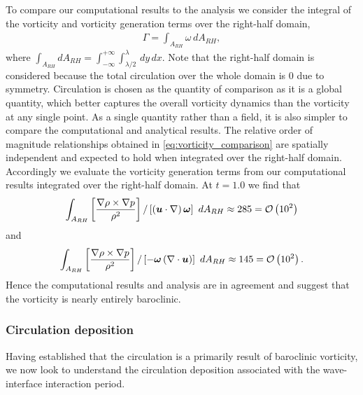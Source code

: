 To compare our computational results to the analysis we consider the
integral of the vorticity and vorticity generation terms over the
right-half domain,
\begin{align}
  \Gamma = \int_{A_{RH}} \omega \,dA_{RH},
\end{align}
where
$\int_{A_{RH}} dA_{RH} =
\int_{-\infty}^{+\infty}\int_{\lambda/2}^{\lambda} \,dy\, dx$. Note
that the right-half domain is considered because the total circulation
over the whole domain is $0$ due to symmetry. Circulation is chosen as
the quantity of comparison as it is a global quantity, which better
captures the overall vorticity dynamics than the vorticity at any
single point. As a single quantity rather than a field, it is also
simpler to compare the computational and analytical results. The
relative order of magnitude relationships obtained in
\eqref{eq:vorticity_comparison} are spatially independent and expected
to hold when integrated over the right-half domain. Accordingly we
evaluate the vorticity generation terms from our computational results
integrated over the right-half domain. At $t=1.0$ we find that %
$$ \int_{A_{RH}} \left[\frac{\nabla\rho\times\nabla p}{\rho^2}\right] / \left[\left(\boldsymbol{u}\cdot\nabla\right)\boldsymbol{\omega}\right]\,\,dA_{RH}\approx 285=\mathcal{O}\left(10^2\right)$$
and
$$ \int_{A_{RH}} \left[\frac{\nabla\rho\times\nabla p}{\rho^2}\right] / \left[-\boldsymbol{\omega}\left(\nabla\cdot\boldsymbol{u}\right)\right]\,\,dA_{RH} \approx 145=\mathcal{O}\left(10^2\right).$$%
%
Hence the computational results and analysis are in agreement and suggest
that the vorticity is nearly entirely baroclinic.
% 
% 
\subsubsection{Circulation deposition}
Having established that the circulation is a primarily result of
baroclinic vorticity, we now look to understand the circulation
deposition associated with the wave-interface interaction period.

